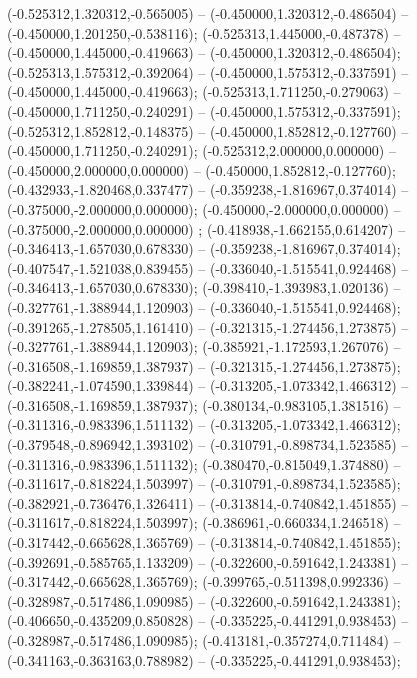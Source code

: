  (-0.525312,1.320312,-0.565005) -- (-0.450000,1.320312,-0.486504) -- (-0.450000,1.201250,-0.538116);
 (-0.525313,1.445000,-0.487378) -- (-0.450000,1.445000,-0.419663) -- (-0.450000,1.320312,-0.486504);
 (-0.525313,1.575312,-0.392064) -- (-0.450000,1.575312,-0.337591) -- (-0.450000,1.445000,-0.419663);
 (-0.525313,1.711250,-0.279063) -- (-0.450000,1.711250,-0.240291) -- (-0.450000,1.575312,-0.337591);
 (-0.525312,1.852812,-0.148375) -- (-0.450000,1.852812,-0.127760) -- (-0.450000,1.711250,-0.240291);
 (-0.525312,2.000000,0.000000) -- (-0.450000,2.000000,0.000000) -- (-0.450000,1.852812,-0.127760);
 (-0.432933,-1.820468,0.337477) -- (-0.359238,-1.816967,0.374014) -- (-0.375000,-2.000000,0.000000);
 (-0.450000,-2.000000,0.000000) -- (-0.375000,-2.000000,0.000000) ;
 (-0.418938,-1.662155,0.614207) -- (-0.346413,-1.657030,0.678330) -- (-0.359238,-1.816967,0.374014);
 (-0.407547,-1.521038,0.839455) -- (-0.336040,-1.515541,0.924468) -- (-0.346413,-1.657030,0.678330);
 (-0.398410,-1.393983,1.020136) -- (-0.327761,-1.388944,1.120903) -- (-0.336040,-1.515541,0.924468);
 (-0.391265,-1.278505,1.161410) -- (-0.321315,-1.274456,1.273875) -- (-0.327761,-1.388944,1.120903);
 (-0.385921,-1.172593,1.267076) -- (-0.316508,-1.169859,1.387937) -- (-0.321315,-1.274456,1.273875);
 (-0.382241,-1.074590,1.339844) -- (-0.313205,-1.073342,1.466312) -- (-0.316508,-1.169859,1.387937);
 (-0.380134,-0.983105,1.381516) -- (-0.311316,-0.983396,1.511132) -- (-0.313205,-1.073342,1.466312);
 (-0.379548,-0.896942,1.393102) -- (-0.310791,-0.898734,1.523585) -- (-0.311316,-0.983396,1.511132);
 (-0.380470,-0.815049,1.374880) -- (-0.311617,-0.818224,1.503997) -- (-0.310791,-0.898734,1.523585);
 (-0.382921,-0.736476,1.326411) -- (-0.313814,-0.740842,1.451855) -- (-0.311617,-0.818224,1.503997);
 (-0.386961,-0.660334,1.246518) -- (-0.317442,-0.665628,1.365769) -- (-0.313814,-0.740842,1.451855);
 (-0.392691,-0.585765,1.133209) -- (-0.322600,-0.591642,1.243381) -- (-0.317442,-0.665628,1.365769);
 (-0.399765,-0.511398,0.992336) -- (-0.328987,-0.517486,1.090985) -- (-0.322600,-0.591642,1.243381);
 (-0.406650,-0.435209,0.850828) -- (-0.335225,-0.441291,0.938453) -- (-0.328987,-0.517486,1.090985);
 (-0.413181,-0.357274,0.711484) -- (-0.341163,-0.363163,0.788982) -- (-0.335225,-0.441291,0.938453);
